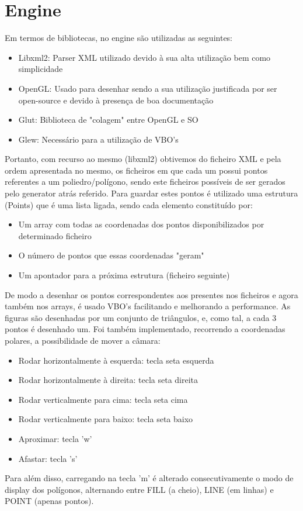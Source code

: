 \documentclass{article}
\begin{document}
\section{Engine}
Em termos de bibliotecas, no engine são utilizadas as seguintes:
\begin{itemize}
    \item Libxml2: Parser XML utilizado devido à sua alta utilização bem como simplicidade
    \item OpenGL: Usado para desenhar sendo a sua utilização justificada por ser open-source e devido à presença de boa documentação
    \item Glut: Biblioteca de "colagem" entre OpenGL e SO
    \item Glew: Necessário para a utilização de VBO's
\end{itemize}
Portanto, com recurso ao mesmo (libxml2) obtivemos do ficheiro XML e pela ordem apresentada no mesmo, os ficheiros em que cada um possui pontos referentes a um poliedro/polígono, sendo este ficheiros possíveis de ser gerados pelo generator atrás referido. 
Para guardar estes pontos é utilizado uma estrutura (Points) que é uma lista ligada, sendo cada elemento constituído por:
\begin{itemize}
    \item Um array com todas as coordenadas dos pontos disponibilizados por determinado ficheiro
    \item O número de pontos que essas coordenadas "geram"
    \item Um apontador para a próxima estrutura (ficheiro seguinte)
\end{itemize}
De modo a desenhar os pontos correspondentes aos presentes nos ficheiros e agora também nos arrays, é usado VBO's facilitando e melhorando a performance. As figuras são desenhadas por um conjunto de triângulos, e, como tal, a cada 3 pontos é desenhado um. 
Foi também implementado, recorrendo a coordenadas polares, a possibilidade de mover a câmara:
\begin{itemize}
    \item Rodar horizontalmente à esquerda: tecla seta esquerda
    \item Rodar horizontalmente à direita: tecla seta direita
    \item Rodar verticalmente para cima: tecla seta cima
    \item Rodar verticalmente para baixo: tecla seta baixo
    \item Aproximar: tecla 'w'
    \item Afastar: tecla 's'
\end{itemize}
Para além disso, carregando na tecla 'm' é alterado consecutivamente o modo de display dos polígonos, alternando entre FILL (a cheio), LINE (em linhas) e POINT (apenas pontos).
\end{document}

